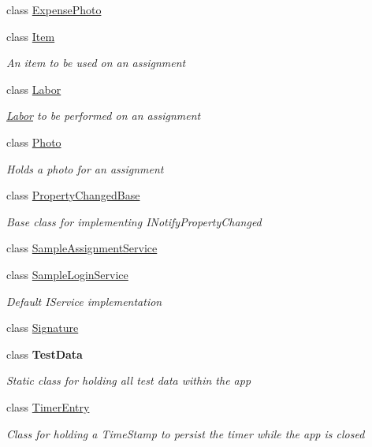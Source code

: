 \begin{DoxyCompactItemize}
class \hyperlink{class_field_service_1_1_data_1_1_expense_photo}{Expense\+Photo}
\item 
class \hyperlink{class_field_service_1_1_data_1_1_item}{Item}
\begin{DoxyCompactList}\small\item\em An item to be used on an assignment \end{DoxyCompactList}\item 
class \hyperlink{class_field_service_1_1_data_1_1_labor}{Labor}
\begin{DoxyCompactList}\small\item\em \hyperlink{class_field_service_1_1_data_1_1_labor}{Labor} to be performed on an assignment \end{DoxyCompactList}\item 
class \hyperlink{class_field_service_1_1_data_1_1_photo}{Photo}
\begin{DoxyCompactList}\small\item\em Holds a photo for an assignment \end{DoxyCompactList}\item 
class \hyperlink{class_field_service_1_1_data_1_1_property_changed_base}{Property\+Changed\+Base}
\begin{DoxyCompactList}\small\item\em Base class for implementing I\+Notify\+Property\+Changed \end{DoxyCompactList}\item 
class \hyperlink{class_field_service_1_1_data_1_1_sample_assignment_service}{Sample\+Assignment\+Service}
\item 
class \hyperlink{class_field_service_1_1_data_1_1_sample_login_service}{Sample\+Login\+Service}
\begin{DoxyCompactList}\small\item\em Default I\+Service implementation \end{DoxyCompactList}\item 
class \hyperlink{class_field_service_1_1_data_1_1_signature}{Signature}
\item 
class {\bfseries Test\+Data}
\begin{DoxyCompactList}\small\item\em Static class for holding all test data within the app \end{DoxyCompactList}\item 
class \hyperlink{class_field_service_1_1_data_1_1_timer_entry}{Timer\+Entry}
\begin{DoxyCompactList}\small\item\em Class for holding a Time\+Stamp to persist the timer while the app is closed \end{DoxyCompactList}\end{DoxyCompactItemize}
